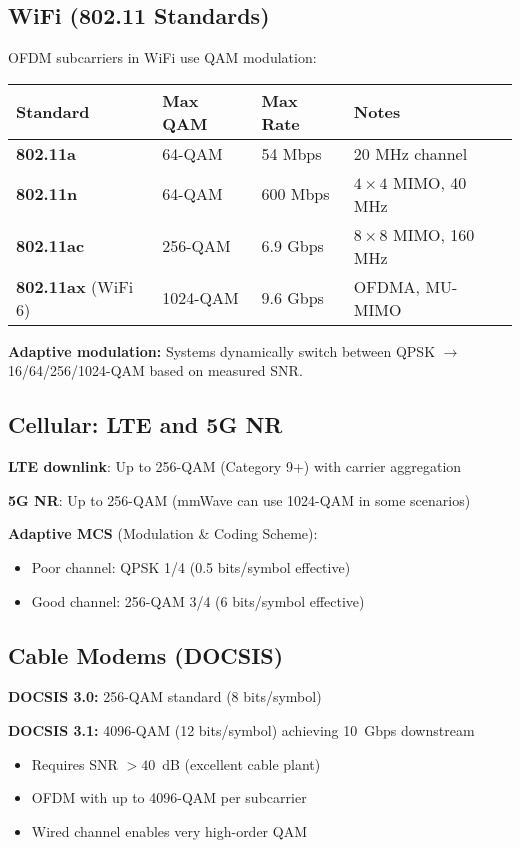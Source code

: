 \subsection{WiFi (802.11 Standards)}

OFDM subcarriers in WiFi use QAM modulation:

{\def\LTcaptype{} %
\begin{longtable}[]{@{}llll@{}}
\toprule\noalign{}
Standard & Max QAM & Max Rate & Notes \\
\midrule\noalign{}
\endhead
\bottomrule\noalign{}
\endlastfoot
\textbf{802.11a} & 64-QAM & 54 Mbps & 20 MHz channel \\
\textbf{802.11n} & 64-QAM & 600 Mbps & $4\times4$ MIMO, 40 MHz \\
\textbf{802.11ac} & 256-QAM & 6.9 Gbps & $8\times8$ MIMO, 160 MHz \\
\textbf{802.11ax} (WiFi 6) & 1024-QAM & 9.6 Gbps & OFDMA, MU-MIMO \\
\end{longtable}
}

\textbf{Adaptive modulation:} Systems dynamically switch between QPSK $\rightarrow$ 16/64/256/1024-QAM based on measured SNR.

\subsection{Cellular: LTE and 5G NR}

\textbf{LTE downlink}: Up to 256-QAM (Category 9+) with carrier aggregation

\textbf{5G NR}: Up to 256-QAM (mmWave can use 1024-QAM in some scenarios)

\textbf{Adaptive MCS} (Modulation \& Coding Scheme):
\begin{itemize}
\item Poor channel: QPSK 1/4 (0.5 bits/symbol effective)
\item Good channel: 256-QAM 3/4 (6 bits/symbol effective)
\end{itemize}

\subsection{Cable Modems (DOCSIS)}

\textbf{DOCSIS 3.0:} 256-QAM standard (8 bits/symbol)

\textbf{DOCSIS 3.1:} 4096-QAM (12 bits/symbol) achieving 10~Gbps downstream
\begin{itemize}
\item Requires SNR $> 40$~dB (excellent cable plant)
\item OFDM with up to 4096-QAM per subcarrier
\item Wired channel enables very high-order QAM
\end{itemize}

